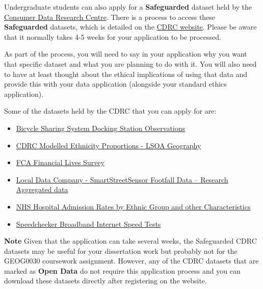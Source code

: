 \documentclass[
]{book}
\providecommand{\tightlist}{%
  \setlength{\itemsep}{0pt}\setlength{\parskip}{0pt}}
\begin{document}
Undergraduate students can also apply for a \textbf{Safeguarded} dataset held by the \href{https://www.cdrc.ac.uk/}{Consumer Data Research Centre}. There is a process to access these \textbf{Safeguarded} datasets, which is detailed on the \href{https://data.cdrc.ac.uk/using-our-data-services}{CDRC website}. Please be aware that it normally takes 4-5 weeks for your application to be processed.

As part of the process, you will need to say in your application why you want that specific dataset and what you are planning to do with it. You will also need to have at least thought about the ethical implications of using that data and provide this with your data application (alongside your standard ethics application).

Some of the datasets held by the CDRC that you can apply for are:

\begin{itemize}
\tightlist
\item
  \href{https://data.cdrc.ac.uk/dataset/bicycle-sharing-system-docking-station-observations}{Bicycle Sharing System Docking Station Observations}
\item
  \href{https://data.cdrc.ac.uk/dataset/cdrc-modelled-ethnicity-proportions-lsoa-geography}{CDRC Modelled Ethnicity Proportions - LSOA Geography}
\item
  \href{https://data.cdrc.ac.uk/dataset/fca-financial-lives-survey}{FCA Financial Lives Survey}
\item
  \href{https://data.cdrc.ac.uk/dataset/local-data-company-smartstreetsensor-footfall-data-\%E2\%80\%93-research-aggregated-data}{Local Data Company - SmartStreetSensor Footfall Data -- Research Aggregated data}
\item
  \href{https://data.cdrc.ac.uk/dataset/nhs-hospital-admission-rates-ethnic-group-and-other-characteristics}{NHS Hospital Admission Rates by Ethnic Group and other Characteristics}
\item
  \href{https://data.cdrc.ac.uk/dataset/speedchecker-broadband-internet-speed-tests}{Speedchecker Broadband Internet Speed Tests}
\end{itemize}

\textbf{Note}
Given that the application can take several weeks, the Safeguarded CDRC datasets may be useful for your dissertation work but probably not for the GEOG0030 coursework assignment. However, any of the CDRC datasets that are marked as \textbf{Open Data} do not require this application process and you can download these datasets directly after registering on the website.
\end{document}
